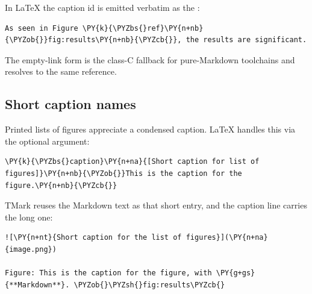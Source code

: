 \documentclass[a4paper,twoside]{article}
\begin{document}
In \LaTeX{} the caption id is emitted verbatim as the :
\begin{tscode}[lang=latex, engine=pygments]
\begin{Verbatim}[commandchars=\\\{\},breaklines, breakanywhere, commandchars=\\\{\}]
As seen in Figure \PY{k}{\PYZbs{}ref}\PY{n+nb}{\PYZob{}}fig:results\PY{n+nb}{\PYZcb{}}, the results are significant.
\end{Verbatim}
\end{tscode}
The empty-link form  is the class-C fallback for pure-Markdown
toolchains and resolves to the same reference.
\subsection{Short caption names}
Printed lists of figures appreciate a condensed caption. \LaTeX{} handles this via the optional  argument:
\begin{tscode}[lang=latex, engine=pygments]
\begin{Verbatim}[commandchars=\\\{\},breaklines, breakanywhere, commandchars=\\\{\}]
\PY{k}{\PYZbs{}caption}\PY{n+na}{[Short caption for list of figures]}\PY{n+nb}{\PYZob{}}This is the caption for the figure.\PY{n+nb}{\PYZcb{}}
\end{Verbatim}
\end{tscode}
TMark reuses the Markdown  text as that short entry, and the caption line
carries the long one:
\begin{tscode}[lang=md, engine=pygments]
\begin{Verbatim}[commandchars=\\\{\},breaklines, breakanywhere, commandchars=\\\{\}]
![\PY{n+nt}{Short caption for the list of figures}](\PY{n+na}{image.png})

Figure: This is the caption for the figure, with \PY{g+gs}{**Markdown**}. \PYZob{}\PYZsh{}fig:results\PYZcb{}
\end{Verbatim}
\end{tscode}
\end{document}
